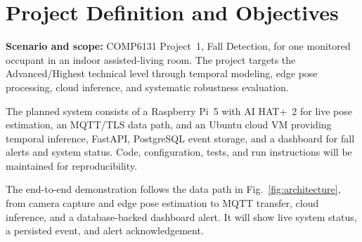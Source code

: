 \section{Project Definition and Objectives}

\textbf{Scenario and scope:} COMP6131 Project~1, Fall Detection, for one monitored occupant in an indoor assisted-living room. The project targets the Advanced/Highest technical level through temporal modeling, edge pose processing, cloud inference, and systematic robustness evaluation.

The planned system consists of a Raspberry Pi~5 with AI HAT+~2 for live pose estimation, an MQTT/TLS data path, and an Ubuntu cloud VM providing temporal inference, FastAPI, PostgreSQL event storage, and a dashboard for fall alerts and system status. Code, configuration, tests, and run instructions will be maintained for reproducibility.

The end-to-end demonstration follows the data path in Fig.~\ref{fig:architecture}, from camera capture and edge pose estimation to MQTT transfer, cloud inference, and a database-backed dashboard alert. It will show live system status, a persisted event, and alert acknowledgement.
